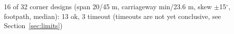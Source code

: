 16 of 32 corner designs (span 20/45 m, carriageway min/23.6 m, skew $\pm$15$^\circ$, footpath, median): 13 ok, 3 timeout (timeouts are not yet conclusive, see Section~\ref{sec:limits})%
